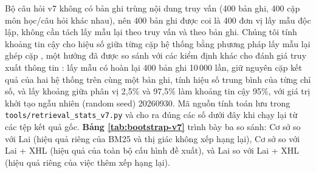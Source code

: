 Bộ câu hỏi v7 không có bản ghi trùng nội dung truy vấn (400 bản ghi, 400 cặp môn học/câu hỏi khác nhau), nên 400 bản ghi được coi là 400 đơn vị lấy mẫu độc lập, không cần tách lấy mẫu lại theo truy vấn và theo bản ghi. Chúng tôi tính khoảng tin cậy cho hiệu số giữa từng cặp hệ thống bằng phương pháp lấy mẫu lại ghép cặp \cite{efron1993bootstrap}, một hướng đã được so sánh với các kiểm định khác cho đánh giá truy xuất thông tin \cite{smucker2007comparison}: lấy mẫu có hoàn lại 400 bản ghi 10\,000 lần, giữ nguyên cặp kết quả của hai hệ thống trên cùng một bản ghi, tính hiệu số trung bình của từng chỉ số, và lấy khoảng giữa phân vị 2,5\% và 97,5\% làm khoảng tin cậy 95\%, với giá trị khởi tạo ngẫu nhiên (random seed) 20260930. Mã nguồn tính toán lưu trong \texttt{tools/retrieval\_stats\_v7.py} và cho ra đúng các số dưới đây khi chạy lại từ các tệp kết quả gốc. \textbf{Bảng \ref{tab:bootstrap-v7}} trình bày ba so sánh: Cơ sở so với Lai (hiệu quả riêng của BM25 và thị giác không xếp hạng lại), Cơ sở so với Lai + XHL (hiệu quả của toàn bộ cấu hình đề xuất), và Lai so với Lai + XHL (hiệu quả riêng của việc thêm xếp hạng lại).

